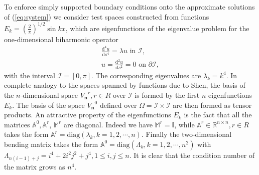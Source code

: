 \documentclass{marine_2015}
\newcommand{\Vh}{\ensuremath{V_{\mathbf{n}}}}
\newcommand{\deriv}[2]{\ensuremath{\frac{\mathrm{d}#1}{\mathrm{d}#2}}}
\begin{document}
To enforce simply supported boundary conditions onto the approximate solutions of
(\ref{eq:system}) we consider test spaces constructed from functions 
$E_k=\left(\tfrac{2}{\pi}\right)^{1/2}\sin{kx}$,
which are eigenfunctions of the eigenvalue problem for the one-dimensional biharmonic 
operator
\[
  \begin{aligned}
  \deriv{^4 u}{s^4} = \lambda u\text{ in }\mathcal{I},\\
  u = \deriv{^2 u}{s^2} = 0\text{ on }\partial\mathcal{I},
  \end{aligned}
\]
with the interval $\mathcal{I}=\left[0, \pi\right]$. The corresponding
eigenvalues are $\lambda_k=k^4$. In complete analogy to the spaces spanned by
functions due to Shen, the basis of the $n$-dimensional space $\Vh^r, r\in R$ over
$\mathcal{I}$ is formed by the first $n$ eigenfunctions $E_k$. The basis of the
space $\Vh^0$ defined over $\Omega=\mathcal{I}\times\mathcal{I}$ are then formed
as tensor products. An attractive property of the eigenfunctions $E_k$ is the fact
that all the matrices $\mathbb{A}^0, \mathbb{A}^r$, $\mathbb{M}^r$ are diagonal. Indeed we
have $\mathbb{M}^r=\mathbb{I}$, while $\mathbb{A}^r\in\mathbb{R}^{n \times n},
r\in R$ takes the form $\mathbb{A}^r=\text{diag}\left(\lambda_k, k=1, 2, \cdots,
n\right)$. Finally the two-dimensional bending matrix takes the form
$\mathbb{A}^0=\text{diag}\left(\Lambda_{k}, k=1, 2, \cdots, n^2\right)$
with $\Lambda_{n(i-1)+j}= i^4 + 2 i^2 j^2 + j^4, 1\leq i, j \leq n$.
It is clear that the condition number of the matrix grows as $n^4$. 
\end{document}
